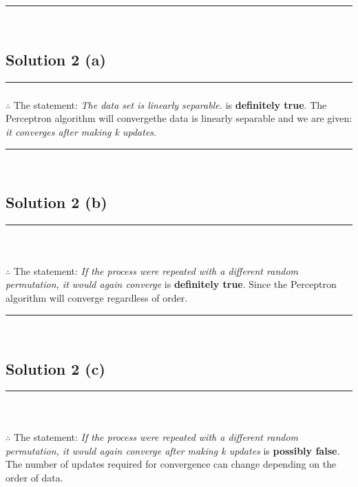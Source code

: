 \documentclass{article}
\begin{document}
\noindent\rule{\textwidth}{0.4pt}\\

\newpage

\subsection*{Solution 2 (a)}
\noindent\rule{\textwidth}{0.4pt}

\subsubsection*{\normalfont}{$\therefore$ The statement: \textit{The data set is linearly separable.} is \textbf{definitely true}. The Perceptron algorithm will convergethe data is linearly separable and we are given: \textit{it converges after making k updates}.}

\noindent\rule{\textwidth}{0.4pt}\\

\subsection*{Solution 2 (b)}
\noindent\rule{\textwidth}{0.4pt}\\

\subsubsection*{\normalfont}{$\therefore$ The statement: \textit{If the process were repeated with a different random permutation, it would again converge} is \textbf{definitely true}. Since the Perceptron algorithm will converge regardless of order.}

\noindent\rule{\textwidth}{0.4pt}\\

\subsection*{Solution 2 (c)}
\noindent\rule{\textwidth}{0.4pt}\\

\subsubsection*{\normalfont}{$\therefore$ The statement: \textit{If the process were repeated with a different random permutation, it would again converge after making k updates} is \textbf{possibly false}. The number of updates required for convergence can change depending on the order of data.}
\end{document}
